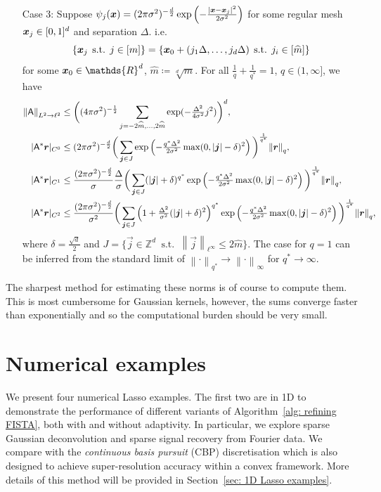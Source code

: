 \documentclass[smallextended]{svjour3}
\let\F\mathds\let\C\mathcal\newcommand{\R}{\F{R}}\newcommand{\A}{\tens{A}}
\newcommand{\norm}[1]{{\left\lVert #1 \right\rVert}}
\newcommand{\1}{\F{1}}
\DeclareMathOperator{\st}{\;s.t.\;}
\renewcommand{\hat}{\widehat}\renewcommand{\tilde}{\widetilde}
\newcommand*{\vard}[1]{%
	\IfEqCase{#1}{%
		{0}{\varphi}%
		{1}{\psi}%
	}[\varphi #1]%
}
\newcommand*{\varx}[1]{%
	\IfEqCase{#1}{%
		{0}{x}%
		{1}{y}%
		{2}{z}%
		{3}{r}%
	}[x#1]%
}
\newcommand*{\vvarx}[1]{\vec{\varx{#1}}}
\begin{document}
\begin{theorem}
{\begin{enumerate}
				\item[Case 3:] Suppose $\vard1_j(\vvarx0) = (2\pi\sigma^2)^{-\frac{d}{2}}\exp\left(-\frac{|\vvarx0-\vvarx0_j|^2}{2\sigma^2}\right)$ for some regular mesh $\vvarx0_j\in[0,1]^d$ and separation $\Delta$. i.e. 
				$$\{\vvarx0_j\st j\in[m]\} = \{\vvarx0_0 + (j_1\Delta,\ldots,j_d\Delta)\st j_i\in[\hat m]\}$$
				for some $\vvarx0_0\in\R^d$, $\hat m\coloneqq\sqrt[d]{m}$. For all $\frac1q + \frac{1}{q^*} = 1$, $q\in(1,\infty]$, we have
				\begin{align}
					\norm{\A}_{L^2\to\ell^2} &\leq \bigg((4\pi\sigma^2)^{-\frac 12}\sum_{j=-2\hat m,\ldots,2\hat m}\exp(-\tfrac{\Delta^2}{4\sigma^2}j^2)\bigg)^d,
					\\ |\A^*\vvarx3|_{C^0} &\leq (2\pi\sigma^2)^{-\frac{d}{2}}\bigg(\sum_{\vec j\in J}\exp\left(-\tfrac{q^*\Delta^2}{2\sigma^2}\max(0,|\vec j|-\delta)^2\right)\bigg)^{\frac1{q^*}}\norm{\vvarx3}_q,
					\\ |\A^*\vvarx3|_{C^1} &\leq \frac{(2\pi\sigma^2)^{-\frac{d}{2}}}{\sigma}\frac{\Delta}{\sigma}\bigg(\sum_{\vec j\in J}(|\vec j|+\delta)^{q^*}\exp\left(-\tfrac{q^*\Delta^2}{2\sigma^2}\max(0,|\vec j|-\delta)^2\right)\bigg)^{\frac1{q^*}}\norm{\vvarx3}_q,
					\\ |\A^*\vvarx3|_{C^2} &\leq \frac{(2\pi\sigma^2)^{-\frac{d}{2}}}{\sigma^2} \bigg(\sum_{\vec j\in J} \left(1+\tfrac{\Delta^2}{\sigma^2}(|\vec j|+\delta)^2\right)^{q^*}\exp\left(-\tfrac{q^*\Delta^2}{2\sigma^2}\max(0,|\vec j|-\delta)^2\right)\bigg)^{\frac1{q^*}} \norm{\vvarx3}_q,
				\end{align}
				where $\delta= \frac{\sqrt d}{2}$ and $J=\{\vec j\in\F Z^d \st \norm{\vec j}_{\ell^\infty}\leq 2\hat m\}$. The case for $q=1$ can be inferred from the standard limit of $\norm\cdot_{{q^*}}\to \norm\cdot_{\infty}$ for $q^*\to\infty$.
			\end{enumerate}
		}
	\end{theorem}
	
	The sharpest method for estimating these norms is of course to compute them. This is most cumbersome for Gaussian kernels, however, the sums converge faster than exponentially and so the computational burden should be very small.
	
	
	\section{Numerical examples}\label{sec: numerics}
	We present four numerical Lasso examples. The first two are in 1D to demonstrate the performance of different variants of Algorithm~\ref{alg: refining FISTA}, both with and without adaptivity. In particular, we explore sparse Gaussian deconvolution and sparse signal recovery from Fourier data. We compare with the \emph{continuous basis pursuit} (CBP) discretisation \cite{Ekanadham2011,Duval2017b} which is also designed to achieve super-resolution accuracy within a convex framework. More details of this method will be provided in Section~\ref{sec: 1D Lasso examples}.
	
\end{document}
